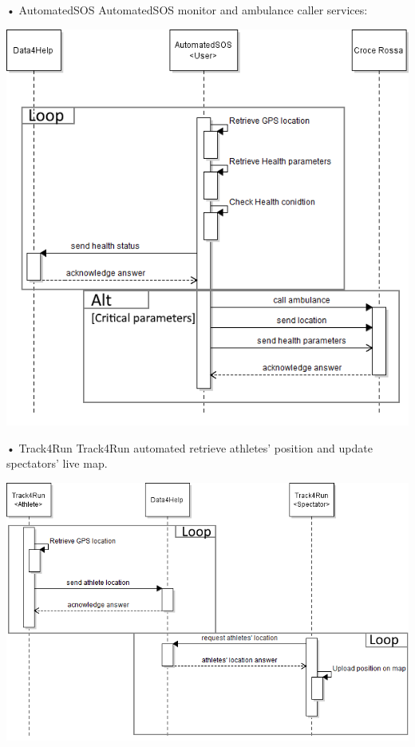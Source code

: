 \begin{enumerate}
\begin{minipage}{\textwidth}
\FloatBarrier
\end{minipage}


\begin{minipage}{\textwidth}
\item[•]{\Large AutomatedSOS}
\FloatBarrier
AutomatedSOS monitor and ambulance caller services:
\begin{center}
\includegraphics[scale=0.8]{Images/Seq_AutoSOS_monitor.png}
\end{center}
\FloatBarrier

\item[•]{\Large Track4Run}
\FloatBarrier
Track4Run automated retrieve athletes' position and update spectators' live map.
\begin{center}
\includegraphics[scale=0.8]{Images/Seq_Track4Run_raceUp.png}
\end{center}
\FloatBarrier
\end{minipage}



\end{enumerate}
